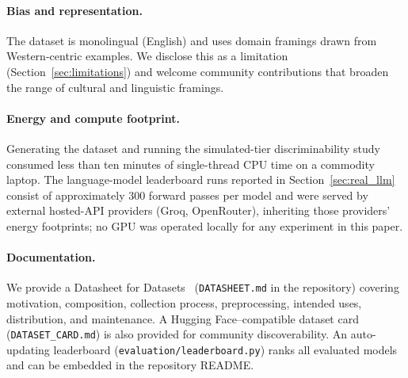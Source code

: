 \documentclass{article}
\begin{document}
\paragraph{Bias and representation.} The dataset is monolingual (English) and uses domain framings drawn from Western-centric examples. We disclose this as a limitation (Section~\ref{sec:limitations}) and welcome community contributions that broaden the range of cultural and linguistic framings.

\paragraph{Energy and compute footprint.} Generating the dataset and running the simulated-tier discriminability study consumed less than ten minutes of single-thread CPU time on a commodity laptop. The language-model leaderboard runs reported in Section~\ref{sec:real_llm} consist of approximately 300 forward passes per model and were served by external hosted-API providers (Groq, OpenRouter), inheriting those providers' energy footprints; no GPU was operated locally for any experiment in this paper.

\paragraph{Documentation.} We provide a Datasheet for Datasets~\citep{gebru2021} (\texttt{DATASHEET.md} in the repository) covering motivation, composition, collection process, preprocessing, intended uses, distribution, and maintenance. A Hugging Face--compatible dataset card (\texttt{DATASET\_CARD.md}) is also provided for community discoverability. An auto-updating leaderboard (\texttt{evaluation/leaderboard.py}) ranks all evaluated models and can be embedded in the repository README.
\end{document}
